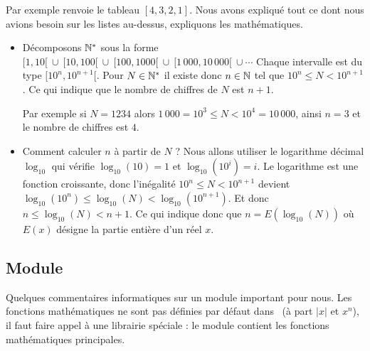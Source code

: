 \documentclass[class=report,crop=false]{standalone}
\begin{document}
Par exemple  renvoie le tableau $[4,3,2,1]$.
Nous avons expliqué tout ce dont nous avions besoin sur les listes au-dessus, expliquons les
mathématiques.
\begin{itemize}
  \item Décomposons $\mathbb{N}^*$ sous la forme
  $[1,10[  \ \cup  \ [10,100[ \ \cup \  [100,1000[ \  \cup \  [1\,000,10\, 000[ \ \cup \cdots$
  Chaque intervalle est du type $[10^n,10^{n+1}[$.
  Pour $N \in \mathbb{N}^*$ il existe donc $n\in\mathbb{N}$ tel que $10^n \le N < 10^{n+1}$. Ce qui indique que le nombre de chiffres
  de $N$ est $n+1$.

  Par exemple si $N=1234$ alors $1 \, 000 = 10^3 \le N < 10^4 = 10\, 000$, ainsi $n=3$ et le nombre de chiffres est $4$.

  \item Comment calculer $n$ à partir de $N$ ? Nous allons utiliser le logarithme décimal $\log_{10}$ qui vérifie
  $\log_{10}(10) = 1$ et $\log_{10}(10^i) = i$. Le logarithme est une fonction croissante, donc l'inégalité
  $10^n \le N < 10^{n+1}$ devient $\log_{10}(10^n) \le \log_{10}(N) < \log_{10}(10^{n+1})$. Et donc $n \le \log_{10}(N) < n+1$.
  Ce qui indique donc que $n = E(\log_{10}(N))$ où $E(x)$ désigne la partie entière d'un réel $x$.
\end{itemize}


\subsection{Module }


Quelques commentaires informatiques sur un module important pour nous.
Les fonctions mathématiques ne sont pas définies par défaut dans \Python\ (à part $|x|$ et $x^n$),
il faut faire appel à une librairie spéciale : le module 
contient les fonctions mathématiques principales.
\end{document}
